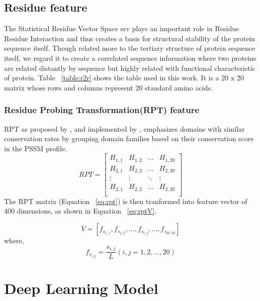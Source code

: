 \subsection{Residue feature} 
The Statistical Residue Vector Space \acrshort{srv} \cite{Wong2018} plays an important role in Residue Residue Interaction and thus creates a basis for structural stability of the protein sequence itself. Though related more to the tertiary structure of protein sequence itself, we regard it to create a correlated sequence information where two proteins are related distantly by sequence but highly related with functional characteristic of protein. Table ~\ref{table:r2r} shows the table used in this work. It is a 20 x 20 matrix whose rows and columns represent 20 standard amino acids.

\subsubsection{Residue Probing Transformation(RPT) feature}
RPT as proposed by \cite[{Jeong et al.}]{Jeong2011}, and implemented by \cite[Pujan et al.]{Mishra2019}, emphasizes domains with similar conservation rates by grouping domain families based on their conservation score in the PSSM profile.
\begin{equation}
  RPT = \begin{bmatrix}
    H_{1,1} & H_{1,2} & \dots & H_{1,20} \\
    H_{2,1} & H_{2,2} & \dots & H_{2,20} \\
    \vdots  & \vdots  & \ddots & \vdots \\
    H_{2,1} & H_{2,2} & \dots & H_{2,20} \\
  \end{bmatrix}
  \label{eq:rpt}
\end{equation}
The RPT matrix (Equation ~\ref{eq:rpt}) is then tranformed into feature vector of 400 dimensions, as shown in Equation ~\ref{eq:rptV}.

\begin{equation}
  V = [ f_{s_{1,1}}, f_{s_{1,2}}, \dots, f_{s_{i,j}}, \dots, f_{s_{20,20}} ]
  \label{eq:rptV}
\end{equation}
where, 
\begin{equation}
  f_{s_{i,j}} = \frac{s_{i,j}}{L} (i,j = 1,2,\dots,20)
  \label{eq:rptF}
\end{equation}


\section{Deep Learning Model}

